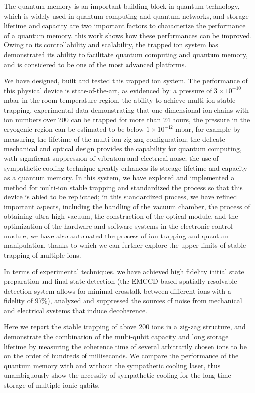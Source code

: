 \begin{abstract*}

  The quantum memory is an important building block in quantum technology, which is widely used in quantum computing and quantum networks, and storage lifetime and capacity are two important factors to characterize the performance of a quantum memory, this work shows how these performances can be improved. Owing to its controllability and scalability, the trapped ion system has demonstrated its ability to facilitate quantum computing and quantum memory, and is considered to be one of the most advanced platforms.

  We have designed, built and tested this trapped ion system. The performance of this physical device is state-of-the-art, as evidenced by: a pressure of $3 \times {10}^{-10}$ mbar in the room temperature region, the ability to achieve multi-ion stable trapping, experimental data demonstrating that one-dimensional ion chains with ion numbers over 200 can be trapped for more than 24 hours, the pressure in the cryogenic region can be estimated to be below $1 \times {10}^{-12}$ mbar, for example by measuring the lifetime of the multi-ion zig-zag configuration; the delicate mechanical and optical design provides the capability for quantum computing, with significant suppression of vibration and electrical noise; the use of sympathetic cooling technique greatly enhances its storage lifetime and capacity as a quantum memory. In this system, we have explored and implemented a method for multi-ion stable trapping and standardized the process so that this device is abled to be replicated; in this standardized process, we have refined important aspects, including the handling of the vacuum chamber, the process of obtaining ultra-high vacuum, the construction of the optical module, and the optimization of the hardware and software systems in the electronic control module; we have also automated the process of ion trapping and quantum manipulation, thanks to which we can further explore the upper limits of stable trapping of multiple ions.

  In terms of experimental techniques, we have achieved high fidelity initial state preparation and final state detection (the EMCCD-based spatially resolvable detection system allows for minimal crosstalk between different ions with a fidelity of 97\%), analyzed and suppressed the sources of noise from mechanical and electrical systems that induce decoherence.

  Here we report the stable trapping of above 200 ions in a zig-zag structure, and demonstrate the combination of the multi-qubit capacity and long storage lifetime by measuring the coherence time of several arbitrarily chosen ions to be on the order of hundreds of milliseconds. We compare the performance of the quantum memory with and without the sympathetic cooling laser, thus unambiguously show the necessity of sympathetic cooling for the long-time storage of multiple ionic qubits.


\end{abstract*}

